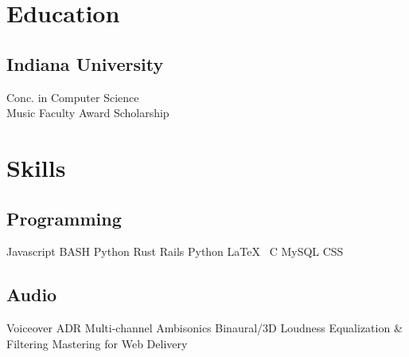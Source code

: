 \documentclass[letterpaper]{deedy-resume} %
\begin{document}
\begin{minipage}[t]{0.33\textwidth} %


\section{Education} 

\subsection{Indiana University}

Conc. in Computer Science \\
Music Faculty Award Scholarship

\sectionspace %


\section{Skills}

\subsection{Programming}

Javascript \textbullet{} BASH \textbullet{} Python \textbullet{} Rust \textbullet{}
 Rails \textbullet{} Python \textbullet{} \LaTeX\ \textbullet{} C \textbullet{} MySQL \textbullet{} CSS
 
\sectionspace %
 
\subsection{Audio}


Voiceover \textbullet{} ADR \textbullet{} Multi-channel \textbullet{} Ambisonics \textbullet{} Binaural/3D \textbullet{}
 Loudness \textbullet{} Equalization \& Filtering \textbullet{} Mastering for Web Delivery


\end{minipage}
\end{document}
